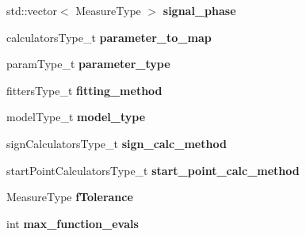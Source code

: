 \begin{DoxyCompactItemize}
\item 
\hypertarget{struct_ox_1_1_tomato_options_a76d334a72a2e2df16e140441cc79ab3e}{std\-::vector$<$ Measure\-Type $>$ {\bfseries signal\-\_\-phase}}\label{struct_ox_1_1_tomato_options_a76d334a72a2e2df16e140441cc79ab3e}

\item 
\hypertarget{struct_ox_1_1_tomato_options_a0d4ad4476a8817e68ead08d1b0645033}{calculators\-Type\-\_\-t {\bfseries parameter\-\_\-to\-\_\-map}}\label{struct_ox_1_1_tomato_options_a0d4ad4476a8817e68ead08d1b0645033}

\item 
\hypertarget{struct_ox_1_1_tomato_options_a943b1f0402f72d794bf21c62c3333f8b}{param\-Type\-\_\-t {\bfseries parameter\-\_\-type}}\label{struct_ox_1_1_tomato_options_a943b1f0402f72d794bf21c62c3333f8b}

\item 
\hypertarget{struct_ox_1_1_tomato_options_a2d1d2149185ef71968980cf8c6afcf14}{fitters\-Type\-\_\-t {\bfseries fitting\-\_\-method}}\label{struct_ox_1_1_tomato_options_a2d1d2149185ef71968980cf8c6afcf14}

\item 
\hypertarget{struct_ox_1_1_tomato_options_a4a5e32c79e597006aaaa79600ddaa564}{model\-Type\-\_\-t {\bfseries model\-\_\-type}}\label{struct_ox_1_1_tomato_options_a4a5e32c79e597006aaaa79600ddaa564}

\item 
\hypertarget{struct_ox_1_1_tomato_options_a2cf923d6d04fb8cb510db2623e93119d}{sign\-Calculators\-Type\-\_\-t {\bfseries sign\-\_\-calc\-\_\-method}}\label{struct_ox_1_1_tomato_options_a2cf923d6d04fb8cb510db2623e93119d}

\item 
\hypertarget{struct_ox_1_1_tomato_options_a9da2993961d10c848b0860284900c869}{start\-Point\-Calculators\-Type\-\_\-t {\bfseries start\-\_\-point\-\_\-calc\-\_\-method}}\label{struct_ox_1_1_tomato_options_a9da2993961d10c848b0860284900c869}

\item 
\hypertarget{struct_ox_1_1_tomato_options_ae2ac4c46e46b4d183c6944771701040b}{Measure\-Type {\bfseries f\-Tolerance}}\label{struct_ox_1_1_tomato_options_ae2ac4c46e46b4d183c6944771701040b}

\item 
\hypertarget{struct_ox_1_1_tomato_options_a9b864c01b6b0b4e4d5a56470f6c5f004}{int {\bfseries max\-\_\-function\-\_\-evals}}\label{struct_ox_1_1_tomato_options_a9b864c01b6b0b4e4d5a56470f6c5f004}


\end{DoxyCompactItemize}
